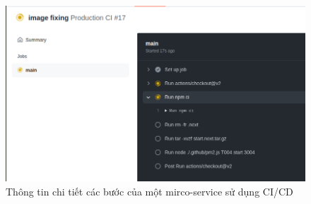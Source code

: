 \begin{figure}[h!]\fontsize{13px}{13px}\selectfont
	\begin{center}	
		\includegraphics[width=\textwidth]{./results/production}
		\caption{Thông tin chi tiết các bước của một mirco-service sử dụng CI/CD}
	\end{center}
\end{figure}


